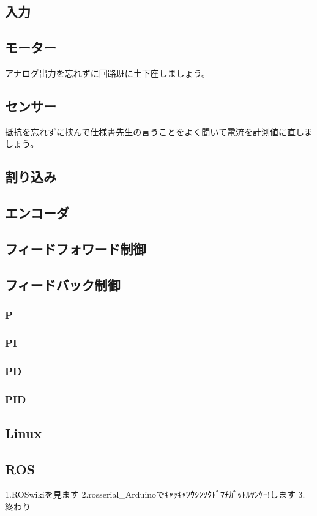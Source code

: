 \documentclass{jarticle}
\begin{document}
   \subsection{入力}
   \subsection{モーター}
      アナログ出力を忘れずに回路班に土下座しましょう。
   \subsection{センサー}
      抵抗を忘れずに挟んで仕様書先生の言うことをよく聞いて電流を計測値に直しましょう。
   \subsection{割り込み}
   \subsection{エンコーダ}
   \subsection{フィードフォワード制御}
   \subsection{フィードバック制御}
      \subsubsection{P}
      \subsubsection{PI}
      \subsubsection{PD}
      \subsubsection{PID}
   \subsection{Linux}
   \subsection{ROS}
      1.ROSwikiを見ます
      2.rosserial_Arduinoでｷｬｯｷｬﾂｳｼﾝｿｸﾄﾞﾏﾁｶﾞｯﾄﾙﾔﾝｹｰ!します
      3.終わり
      
\end{document}
